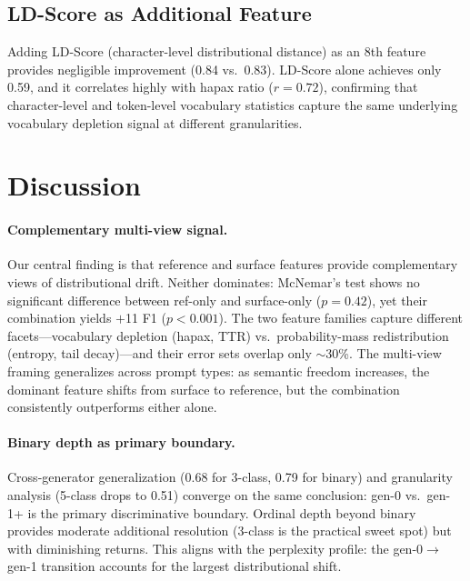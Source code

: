 \documentclass[letterpaper,11pt]{article}
\begin{document}
\subsection{LD-Score as Additional Feature}
\label{sec:ldscore}

Adding LD-Score (character-level distributional distance) as an 8th feature provides negligible improvement (0.84 vs.\ 0.83). LD-Score alone achieves only 0.59, and it correlates highly with hapax ratio ($r = 0.72$), confirming that character-level and token-level vocabulary statistics capture the same underlying vocabulary depletion signal at different granularities.

\section{Discussion}
\label{sec:discussion}

\paragraph{Complementary multi-view signal.} Our central finding is that reference and surface features provide complementary views of distributional drift. Neither dominates: McNemar's test shows no significant difference between ref-only and surface-only ($p = 0.42$), yet their combination yields $+$11 F1 ($p < 0.001$). The two feature families capture different facets---vocabulary depletion (hapax, TTR) vs.\ probability-mass redistribution (entropy, tail decay)---and their error sets overlap only $\sim$30\%. The multi-view framing generalizes across prompt types: as semantic freedom increases, the dominant feature shifts from surface to reference, but the combination consistently outperforms either alone.

\paragraph{Binary depth as primary boundary.} Cross-generator generalization (0.68 for 3-class, 0.79 for binary) and granularity analysis (5-class drops to 0.51) converge on the same conclusion: gen-0 vs.\ gen-1+ is the primary discriminative boundary. Ordinal depth beyond binary provides moderate additional resolution (3-class is the practical sweet spot) but with diminishing returns. This aligns with the perplexity profile: the gen-0$\to$gen-1 transition accounts for the largest distributional shift.
\end{document}
